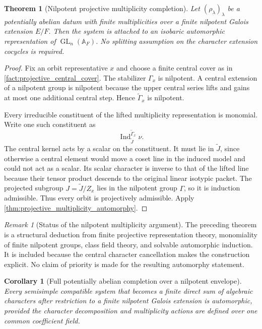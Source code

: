 \documentclass{aomart}
\newtheorem{theorem}{Theorem}[section]
\newtheorem{corollary}[corollary]{Corollary}
\theoremstyle{definition}
\theoremstyle{remark}
\newtheorem{remark}[remark]{Remark}
\newcommand{\GL}{\operatorname{GL}}
\newcommand{\Ind}{\operatorname{Ind}}
\newcommand{\Adele}{\mathbb A}
\begin{document}
\begin{theorem}[Nilpotent projective multiplicity completion]\label{thm:nilpotent_projective_multiplicity}
Let \((\rho_\lambda)_\lambda\) be a potentially abelian datum with finite multiplicities over a finite nilpotent Galois extension \(E/F\). Then the system is attached to an isobaric automorphic representation of \(\GL_n(\Adele_F)\). No splitting assumption on the character extension cocycles is required.
\end{theorem}

\begin{proof}
Fix an orbit representative \(x\) and choose a finite central cover as in \cref{fact:projective_central_cover}. The stabilizer \(\Gamma_x\) is nilpotent. A central extension of a nilpotent group is nilpotent because the upper central series lifts and gains at most one additional central step. Hence \(\widetilde\Gamma_x\) is nilpotent.

Every irreducible constituent of the lifted multiplicity representation is monomial. Write one such constituent as
\[
\Ind_{\widetilde J}^{\widetilde\Gamma_x}\nu.
\]
The central kernel acts by a scalar on the constituent. It must lie in \(\widetilde J\), since otherwise a central element would move a coset line in the induced model and could not act as a scalar. Its scalar character is inverse to that of the lifted line because their tensor product descends to the original linear isotypic packet. The projected subgroup \(J=\widetilde J/Z_x\) lies in the nilpotent group \(\Gamma\), so it is induction admissible. Thus every orbit is projectively admissible. Apply \cref{thm:projective_multiplicity_automorphy}.
\end{proof}

\begin{remark}[Status of the nilpotent multiplicity argument]\label{rem:nilpotent_multiplicity_status}
The preceding theorem is a structural deduction from finite projective representation theory, monomiality of finite nilpotent groups, class field theory, and solvable automorphic induction. It is included because the central character cancellation makes the construction explicit. No claim of priority is made for the resulting automorphy statement.
\end{remark}

\begin{corollary}[Full potentially abelian completion over a nilpotent envelope]\label{cor:full_nilpotent_potential}
Every semisimple compatible system that becomes a finite direct sum of algebraic characters after restriction to a finite nilpotent Galois extension is automorphic, provided the character decomposition and multiplicity actions are defined over one common coefficient field.
\end{corollary}
\end{document}
